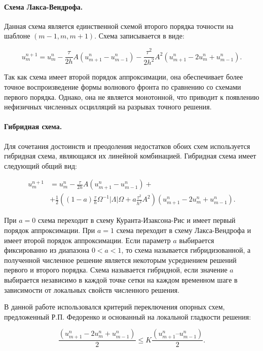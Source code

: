 \paragraph{Схема Лакса-Вендрофа.} Данная схема является единственной схемой второго порядка точности на шаблоне $(m-1, m, m+1)$. Схема записывается в виде:

\begin{equation}
	\label{LW scheme}
	u^{n+1}_m = u^n_m - \frac{\tau}{2h} A (u^n_{m+1} - u^n_{m-1})
	 - \frac{\tau^2}{2h^2} A^2 (u^n_{m+1} - 2u^n_m + u^n_{m-1}) .
\end{equation}

Так как схема имеет второй порядок аппроксимации, она обеспечивает более точное воспроизведение формы волнового фронта по сравнению со схемами первого порядка. Однако, она не является монотонной, что приводит к появлению нефизичных численных осцилляций на разрывах точного решения.


\paragraph{Гибридная схема.} Для сочетания достоинств и преодоления недостатков обоих схем используется гибридная схема, являющаяся их линейной комбинацией. Гибридная схема имеет следующий общий вид:

\begin{align}
\label{hybrid scheme}
u^{n+1}_m &= u^n_m - \frac{\tau}{2h} A (u^n_{m+1} - u^n_{m-1}) + \nonumber\\
	 &+ \frac{1}{2} ((1-a) \frac{\tau}{h} \Omega^{-1} |\Lambda| \Omega + a \frac{\tau^2}{h^2} A^2 ) (u^n_{m+1} - 2u^n_m + u^n_{m-1}).
\end{align}

При $a = 0$ схема переходит в схему Куранта-Изаксона-Рис и имеет первый порядок аппроксимации. При $a = 1$ схема переходит в схему Лакса-Вендрофа и имеет второй порядок аппроксимации. Если параметр $a$ выбирается фиксированно из диапазона $0 < a < 1$, то схема называется гибридизованной, а полученной численное решение является некоторым усреднением решений первого и второго порядка. Схема называется гибридной, если значение $a$ выбирается независимо в каждой точке сетки на каждом временном шаге в зависимости от локальных свойств численного решения.

В данной работе использовался критерий переключения опорных схем, предложенный Р.П. Федоренко и основанный на локальной гладкости решения:

\begin{equation}
	\label{Fedorenko criterium}
	\frac{(u^n_{m+1} - 2u^n_m + u^n_{m-1})}{2} \le K \frac{(u^n_{m+1} – u^n_{m-1})}{2} .
\end{equation}

